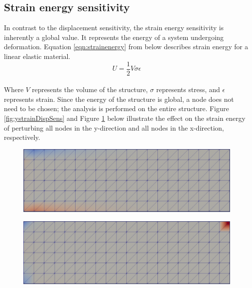 \subsection{Strain energy sensitivity} \label{section:strainSens}
In contrast to the displacement sensitivity, the strain energy sensitivity is inherently a global value. It represents the energy of a system undergoing deformation. Equation \ref{eqn:strainenergy} from \cite{wiki:strainEnergy} below describes strain energy for a linear elastic material.\\
\begin{equation} \label{eqn:strainenergy}
U = \frac{1}{2}V\sigma\epsilon
\end{equation}\\
Where $V$ represents the volume of the structure, $\sigma$ represents stress, and $\epsilon$ represents strain. Since the energy of the structure is global, a node does not need to be chosen; the analysis is performed on the entire structure. Figure \ref{fig:ystrainDispSens} and Figure \ref{fig:xstrainDispSens} below illustrate the effect on the strain energy of perturbing all nodes in the y-direction and all nodes in the x-direction, respectively. \\
\begin{figure}[ht]
\centering
\begin{minipage}{.5\textwidth}
  \centering
  \includegraphics[width=0.95\linewidth]{images/strainsensitivityanalysisY.png}
  \label{fig:ystrainDispSens}
\end{minipage}%
\begin{minipage}{.5\textwidth}
  \centering
  \includegraphics[width=0.95\linewidth]{images/strainsensitivityanalysisX.png}
  \label{fig:xstrainDispSens}
\end{minipage}
\end{figure}\\
